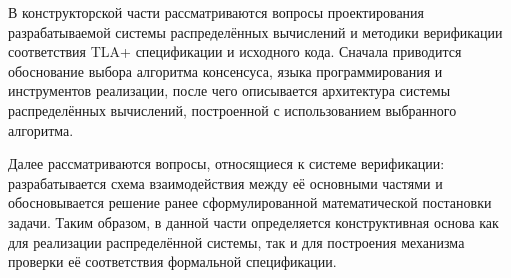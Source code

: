 
В конструкторской части рассматриваются вопросы проектирования разрабатываемой
системы распределённых вычислений и методики верификации соответствия TLA+
спецификации и исходного кода. Сначала приводится обоснование выбора алгоритма
консенсуса, языка программирования и инструментов реализации, после чего
описывается архитектура системы распределённых вычислений, построенной с
использованием выбранного алгоритма.

Далее рассматриваются вопросы, относящиеся к системе верификации:
разрабатывается схема взаимодействия между её основными частями и
обосновывается решение ранее сформулированной математической постановки задачи.
Таким образом, в данной части определяется конструктивная основа как для
реализации распределённой системы, так и для построения механизма проверки её
соответствия формальной спецификации.
